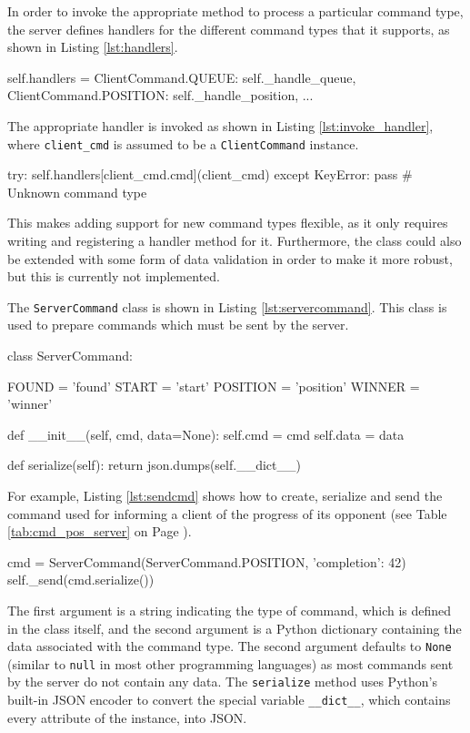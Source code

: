In order to invoke the appropriate method to process a particular command type, the server defines handlers for the different command types that it supports, as shown in Listing \ref{lst:handlers}.

\begin{code}[language={Python}, caption={Handlers for Different Command Types}, label={lst:handlers}]
self.handlers = {
		ClientCommand.QUEUE: self._handle_queue,
		ClientCommand.POSITION: self._handle_position,
		...
	}
\end{code}

The appropriate handler is invoked as shown in Listing \ref{lst:invoke_handler}, where \texttt{client\_cmd} is assumed to be a \texttt{Client\-Command} instance.

\begin{code}[language={Python}, caption={Invoking a Handler Method}, label={lst:invoke_handler}]
try:
	self.handlers[client_cmd.cmd](client_cmd)
except KeyError:
	pass # Unknown command type
\end{code}

This makes adding support for new command types flexible, as it only requires writing and registering a handler method for it.
Furthermore, the class could also be extended with some form of data validation in order to make it more robust, but this is currently not implemented.

The \texttt{Server\-Command} class is shown in Listing \ref{lst:servercommand}.
This class is used to prepare commands which must be sent by the server.

\begin{code}[language={Python}, caption={\texttt{ServerCommand} Class}, label={lst:servercommand}]
class ServerCommand:

	FOUND = 'found'
	START = 'start'
	POSITION = 'position'
	WINNER = 'winner'

	def __init__(self, cmd, data=None):
		self.cmd = cmd
		self.data = data

	def serialize(self):
		return json.dumps(self.__dict__)
\end{code}

For example, Listing \ref{lst:sendcmd} shows how to create, serialize and send the command used for informing a client of the progress of its opponent (see Table \ref{tab:cmd_pos_server} on Page \pageref{tab:cmd_pos_server}).

\begin{code}[language={Python}, caption={Creating and Sending a Command}, label={lst:sendcmd}]
cmd = ServerCommand(ServerCommand.POSITION, {'completion': 42})
self._send(cmd.serialize())
\end{code}

The first argument is a string indicating the type of command, which is defined in the class itself, and the second argument is a Python dictionary containing the data associated with the command type.
The second argument defaults to \texttt{None} (similar to \texttt{null} in most other programming languages) as most commands sent by the server do not contain any data.
The \texttt{serialize} method uses Python's built-in JSON encoder to convert the special variable \texttt{\_\_dict\_\_}, which contains every attribute of the instance, into JSON.
